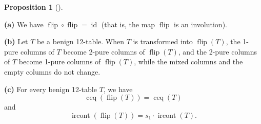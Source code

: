 \documentclass[numbers=enddot,12pt,final,onecolumn,notitlepage]{scrartcl}%
\theoremstyle{definition}
\newtheorem{prop}[theo]{Proposition}
\newenvironment{proposition}[1][]
{\begin{prop}[#1]\begin{leftbar}}
{\end{leftbar}\end{prop}}
\begin{document}
\begin{proposition}
\label{prop.flip}\textbf{(a)} We have $\operatorname*{flip}\circ
\operatorname*{flip}=\operatorname*{id}$ (that is, the map
$\operatorname*{flip}$ is an involution).

\textbf{(b)} Let $T$ be a benign 12-table. When $T$ is transformed into
$\operatorname*{flip}\left(  T\right)  $, the 1-pure columns of $T$ become
2-pure columns of $\operatorname*{flip}\left(  T\right)  $, and the 2-pure
columns of $T$ become 1-pure columns of $\operatorname*{flip}\left(  T\right)
$, while the mixed columns and the empty columns do not change.

\textbf{(c)} For every benign 12-table $T$, we have%
\begin{equation}
\operatorname*{ceq}\left(  \operatorname*{flip}\left(  T\right)  \right)
=\operatorname*{ceq}\left(  T\right)  \label{pf.lem.BK.flip.ceq}%
\end{equation}
and%
\begin{equation}
\operatorname*{ircont}\left(  \operatorname*{flip}\left(  T\right)  \right)
=s_{1}\cdot\operatorname*{ircont}\left(  T\right)  .
\label{pf.lem.BK.flip.ircont}%
\end{equation}

\end{proposition}
\end{document}
